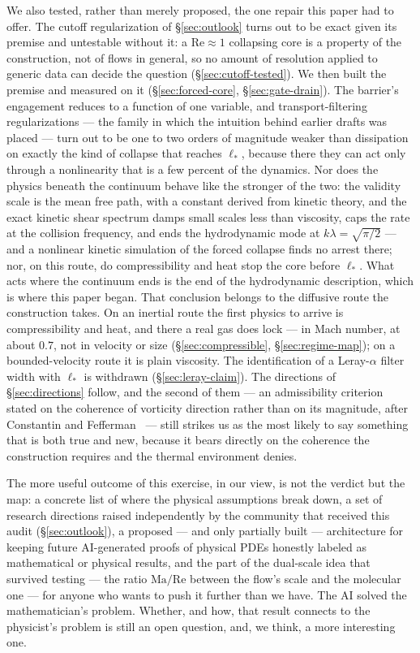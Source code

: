 \documentclass[11pt,a4paper]{article}
\begin{document}
We also tested, rather than merely proposed, the one repair this paper had to offer. The cutoff
regularization of \S\ref{sec:outlook} turns out to be exact given its premise and untestable
without it: a $\mathrm{Re}\approx1$ collapsing core is a property of the construction, not of flows
in general, so no amount of resolution applied to generic data can decide the question
(\S\ref{sec:cutoff-tested}). We then built the premise and measured on it
(\S\ref{sec:forced-core}, \S\ref{sec:gate-drain}). The barrier's engagement reduces to a function of
one variable, and transport-filtering regularizations --- the family in which the intuition behind
earlier drafts was placed --- turn out to be one to two orders of magnitude weaker than dissipation
on exactly the kind of collapse that reaches $\ell_*$, because there they can act only through a
nonlinearity that is a few percent of the dynamics. Nor does the physics beneath the continuum
behave like the stronger of the two: the validity scale is the mean free path, with a constant
derived from kinetic theory, and the exact kinetic shear spectrum damps small scales less than
viscosity, caps the rate at the collision frequency, and ends the hydrodynamic mode at
$k\lambda=\sqrt{\pi/2}$ --- and a nonlinear kinetic simulation of the forced collapse finds no arrest
there; nor, on this route, do compressibility and heat stop the core before $\ell_*$. What acts where
the continuum ends is the end of the hydrodynamic description, which is where this paper began. That
conclusion belongs to the diffusive route the construction takes. On an inertial route the first
physics to arrive is compressibility and heat, and there a real gas does lock --- in Mach number, at
about $0.7$, not in velocity or size (\S\ref{sec:compressible}, \S\ref{sec:regime-map}); on a
bounded-velocity route it is plain viscosity. The identification of a Leray-$\alpha$ filter width with
$\ell_*$ is withdrawn (\S\ref{sec:leray-claim}). The directions of \S\ref{sec:directions}
follow, and the second of them
--- an admissibility criterion stated on the coherence of vorticity direction rather than on its
magnitude, after Constantin and Fefferman~\cite{ConstantinFefferman1993} --- still strikes us as the
most likely to say something that is both true and new, because it bears directly on the coherence
the construction requires and the thermal environment denies.

The more useful outcome of this exercise, in our view, is not the verdict but the map: a concrete
list of where the physical assumptions break down, a set of research directions raised
independently by the community that received this audit (\S\ref{sec:outlook}), a proposed
--- and only partially built --- architecture for keeping future AI-generated proofs of physical
PDEs honestly labeled as mathematical or physical results, and the part of the dual-scale idea that
survived testing --- the ratio $\mathrm{Ma}/\mathrm{Re}$ between the flow's scale and the molecular
one --- for anyone who wants to push it further than we have. The AI solved the
mathematician's problem. Whether, and how, that result connects to the physicist's problem is still
an open question, and, we think, a more interesting one.
\end{document}
